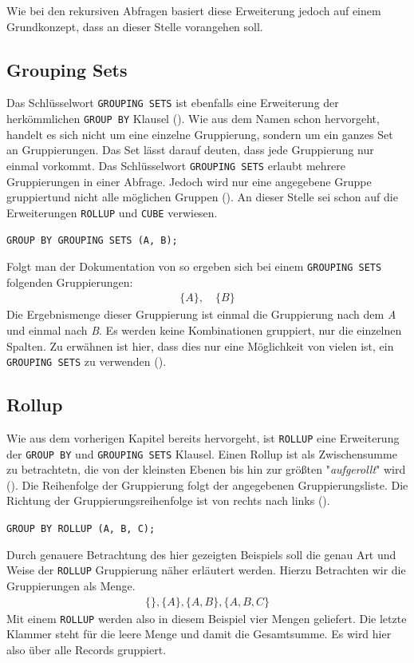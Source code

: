 Wie bei den rekursiven Abfragen basiert diese Erweiterung jedoch auf einem Grundkonzept,
dass an dieser Stelle vorangehen soll.

\subsection{Grouping Sets}
Das Schlüsselwort \texttt{GROUPING SETS} ist ebenfalls eine Erweiterung der herkömmlichen
\texttt{GROUP BY} Klausel (\cite{oracle16}). Wie aus dem Namen schon hervorgeht,
handelt es sich nicht um eine einzelne Gruppierung, sondern um ein ganzes Set an
Gruppierungen. Das Set lässt darauf deuten, dass jede Gruppierung nur einmal vorkommt.
Das Schlüsselwort \texttt{GROUPING SETS} erlaubt mehrere Gruppierungen in einer Abfrage.
Jedoch wird nur eine angegebene Gruppe gruppiertund nicht alle möglichen Gruppen
(\cite{oracle16}). An dieser Stelle sei schon auf die Erweiterungen \texttt{ROLLUP}
und \texttt{CUBE} verwiesen.

\texttt{GROUP BY GROUPING SETS (A, B);}

Folgt man der Dokumentation von \cite{oracle16} so ergeben sich bei einem \texttt{GROUPING
SETS} folgenden Gruppierungen:
\begin{align*}
	\{A\}, \quad \{B\}
\end{align*}
Die Ergebnismenge dieser Gruppierung ist einmal die Gruppierung nach dem \textit{A}
und einmal nach \textit{B}. Es werden keine Kombinationen gruppiert, nur die einzelnen
Spalten. Zu erwähnen ist hier, dass dies nur eine Möglichkeit von vielen ist,
ein \texttt{GROUPING SETS} zu verwenden (\cite{oracle16}).

\subsection{Rollup}
Wie aus dem vorherigen Kapitel bereits hervorgeht, ist \texttt{ROLLUP} eine Erweiterung
der \texttt{GROUP BY} und \texttt{GROUPING SETS} Klausel. Einen Rollup ist als
Zwischensumme zu betrachtetn, die von der kleinsten Ebenen bis hin zur größten "\textit{aufgerollt}"
wird (\cite{oracle16}). Die Reihenfolge der Gruppierung folgt der angegebenen Gruppierungsliste.
Die Richtung der Gruppierungsreihenfolge ist von rechts nach links (\cite{oracle16}).

\texttt{GROUP BY ROLLUP (A, B, C);}

Durch genauere Betrachtung des hier gezeigten Beispiels soll die genau Art und
Weise der \texttt{ROLLUP} Gruppierung näher erläutert werden. Hierzu Betrachten
wir die Gruppierungen als Menge.
\begin{align*}
	\{ \}, \{A\}, \{A, B\}, \{A, B, C\}
\end{align*}
Mit einem \texttt{ROLLUP} werden also in diesem Beispiel vier Mengen geliefert. Die
letzte Klammer steht für die leere Menge und damit die Gesamtsumme. Es wird hier
also über alle Records gruppiert.

